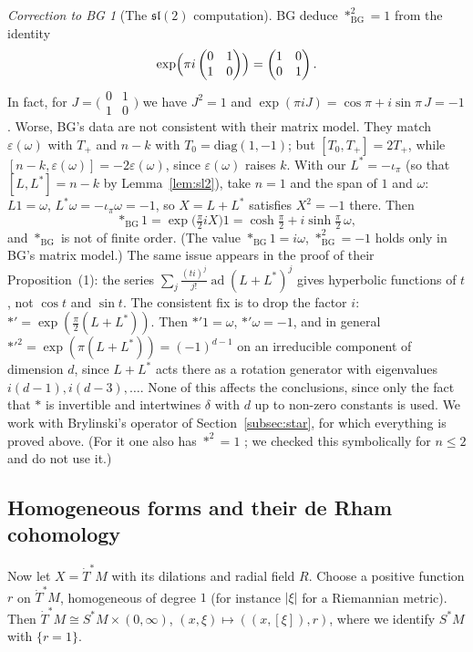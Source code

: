 \documentclass[11pt,oneside,reqno]{article}
\DeclareMathOperator{\ad}{ad}
\newcommand{\Tdot}{\dot T^*}
\newcommand{\eps}{\varepsilon}
\theoremstyle{plain}
\theoremstyle{definition}
\theoremstyle{remark}
\newtheorem{correction}[theorem]{Correction to BG}
\begin{document}
\begin{correction}[The \(\mathfrak{sl}(2)\) computation]\label{corr:sl2}
BG deduce \(*_{\mathrm{BG}}^2=1\) from the identity
\[
 \exp\Bigl(\pi i\begin{pmatrix}0&1\\1&0\end{pmatrix}\Bigr)=
 \begin{pmatrix}1&0\\0&1\end{pmatrix}.
\]
In fact, for \(J=\bigl(\begin{smallmatrix}0&1\\1&0\end{smallmatrix}\bigr)\) we have \(J^2=1\) and
\(\exp(\pi iJ)=\cos\pi+i\sin\pi\,J=-1\). Worse, BG's data are not consistent with
their matrix model. They match \(\eps(\omega)\) with \(T_+\) and \(n-k\) with
\(T_0=\mathrm{diag}(1,-1)\); but \([T_0,T_+]=2T_+\), while \([n-k,\eps(\omega)]=-2\eps(\omega)\), since
\(\eps(\omega)\) raises \(k\). With our \(L^*=-\iota_\pi\) (so that \([L,L^*]=n-k\) by
Lemma~\ref{lem:sl2}), take \(n=1\) and the span of \(1\) and \(\omega\): \(L1=\omega\),
\(L^*\omega=-\iota_\pi\omega=-1\), so \(X=L+L^*\) satisfies \(X^2=-1\) there. Then
\[
 *_{\mathrm{BG}}1=\exp\bigl(\tfrac{\pi}2iX\bigr)1=\cosh\tfrac\pi2+i\sinh\tfrac\pi2\,\omega ,
\]
and \(*_{\mathrm{BG}}\) is not of finite order. (The value \(*_{\mathrm{BG}}1=i\omega\), \(*_{\mathrm{BG}}^2=-1\)
holds only in BG's matrix model.) The same issue appears in the proof of their
Proposition~(1): the series \(\sum_j\frac{(ti)^j}{j!}\ad(L+L^*)^j\) gives hyperbolic
functions of \(t\), not \(\cos t\) and \(\sin t\). The consistent fix is to drop the factor
\(i\): \(*'=\exp(\frac\pi2(L+L^*))\). Then \(*'1=\omega\), \(*'\omega=-1\), and in general
\(*'^2=\exp(\pi(L+L^*))=(-1)^{d-1}\) on an irreducible component of dimension \(d\),
since \(L+L^*\) acts there as a rotation generator with eigenvalues
\(i(d-1),i(d-3),\dots\). None of this affects the conclusions, since only
the fact that \(*\) is invertible and intertwines \(\delta\) with \(d\) up to
non-zero constants is used. We work with Brylinski's operator of
Section~\ref{subsec:star}, for which everything is proved above. (For it one
also has \(*^2=1\) \cite{Brylinski}; we checked this symbolically for \(n\le2\) and
do not use it.)
\end{correction}

\subsection{Homogeneous forms and their de Rham cohomology}\label{subsec:homdR}
Now let \(X=\Tdot M\) with its dilations and radial field \(R\). Choose a positive
function \(r\) on \(\Tdot M\), homogeneous of degree \(1\) (for instance \(|\xi|\) for a
Riemannian metric). Then \(\Tdot M\cong S^*M\times(0,\infty)\), \((x,\xi)\mapsto
((x,[\xi]),r)\), where we identify \(S^*M\) with \(\{r=1\}\).
\end{document}
